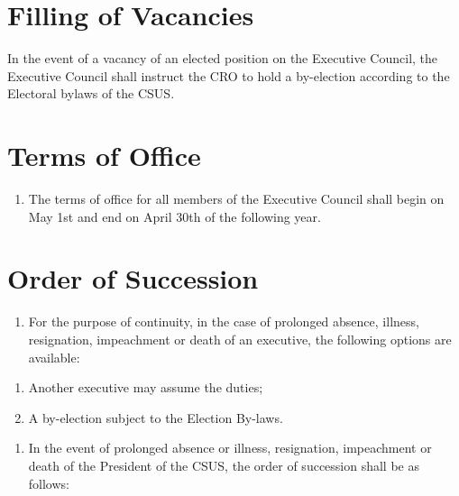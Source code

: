 \section{Filling of Vacancies}\label{filling-of-vacancies}

In the event of a vacancy of an elected position on the Executive
Council, the Executive Council shall instruct the CRO to hold a
by-election according to the Electoral bylaws of the CSUS.

\section{Terms of Office}\label{terms-of-office}

\begin{enumerate}
\def\labelenumi{\arabic{enumi}.}
\tightlist
\item
  The terms of office for all members of the Executive Council shall
  begin on May 1st and end on April 30th of the following year.
\end{enumerate}

\section{Order of Succession}\label{order-of-succession}

\begin{enumerate}
\def\labelenumi{\arabic{enumi}.}
\tightlist
\item
  For the purpose of continuity, in the case of prolonged absence,
  illness, resignation, impeachment or death of an executive, the
  following options are available:
\end{enumerate}

\begin{enumerate}
\def\labelenumi{(\alph{enumi})}
\tightlist
\item
  Another executive may assume the duties;
\item
  A by-election subject to the Election By-laws.
\end{enumerate}

\begin{enumerate}
\def\labelenumi{\arabic{enumi}.}
\setcounter{enumi}{1}
\tightlist
\item
  In the event of prolonged absence or illness, resignation, impeachment
  or death of the President of the CSUS, the order of succession shall
  be as follows:
\end{enumerate}

